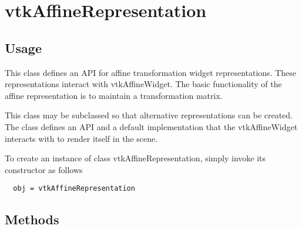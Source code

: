 \section{vtkAffineRepresentation}

\subsection{Usage}

 This class defines an API for affine transformation widget
 representations. These representations interact with vtkAffineWidget. The
 basic functionality of the affine representation is to maintain a
 transformation matrix.

 This class may be subclassed so that alternative representations can
 be created.  The class defines an API and a default implementation that
 the vtkAffineWidget interacts with to render itself in the scene.

To create an instance of class vtkAffineRepresentation, simply
invoke its constructor as follows
\begin{verbatim}
  obj = vtkAffineRepresentation
\end{verbatim}
\subsection{Methods}

